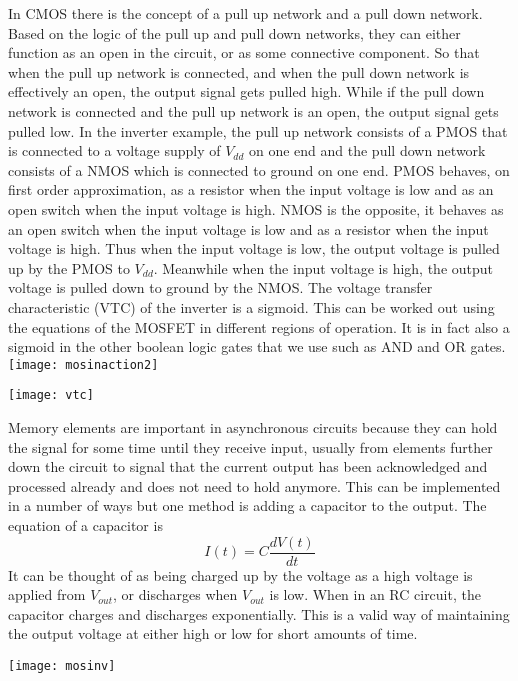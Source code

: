 \documentclass{article}
\begin{document}
\newline \newline
In CMOS there is the concept of a pull up network and a pull down network.  Based on the logic of the pull up and pull down networks, they can either function as an open in the circuit, or as some connective component.  So that when the pull up network is connected, and when the pull down network is effectively an open, the output signal gets pulled high.  While if the pull down network is connected and the pull up network is an open, the output signal gets pulled low.  In the inverter example, the pull up network consists of a PMOS that is connected to a voltage supply of $V_{dd}$ on one end and the pull down network consists of a NMOS which is connected to ground on one end.  PMOS behaves, on first order approximation, as a resistor when the input voltage is low and as an open switch when the input voltage is high.  NMOS is the opposite, it behaves as an open switch when the input voltage is low and as a resistor when the input voltage is high.  Thus when the input voltage is low, the output voltage is pulled up by the PMOS to $V_{dd}$.  Meanwhile when the input voltage is high, the output voltage is pulled down to ground by the NMOS.  The voltage transfer characteristic (VTC) of the inverter is a sigmoid.  This can be worked out using the equations of the MOSFET in different regions of operation.  It is in fact also a sigmoid in the other boolean logic gates that we use such as AND and OR gates.
\newline \newline
\texttt{[image: mosinaction2]}
\begin{center}
\texttt{[image: vtc]}
\end{center}
\newline \newline

Memory elements are important in asynchronous circuits because they can hold the signal for some time until they receive input, usually from elements further down the circuit to signal that the current output has been acknowledged and processed already and does not need to hold anymore.  This can be implemented in a number of ways but one method is adding a capacitor to the output.  The equation of a capacitor is 
\[I(t)=C\frac{dV(t)}{dt}
\]
It can be thought of as being charged up by the voltage as a high voltage is applied from $V_{out}$, or discharges when $V_{out}$ is low.  When in an RC circuit, the capacitor charges and discharges exponentially.  This is a valid way of maintaining the output voltage at either high or low for short amounts of time. 
\begin{center}
\texttt{[image: mosinv]}
\end{center}
\end{document}
